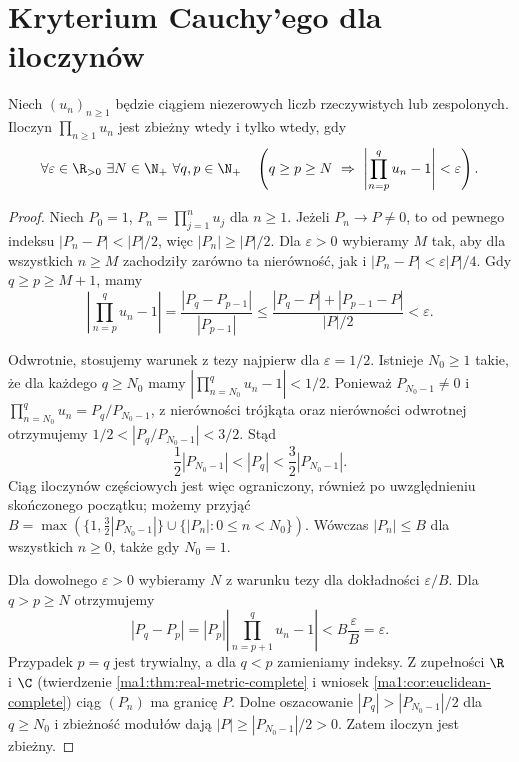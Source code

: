 \section{Kryterium Cauchy'ego dla iloczynów}
\begin{twierdzenie}
\label{ma1:thm:product-cauchy}
Niech $(u_n)_{n\ge1}$ będzie ciągiem niezerowych liczb rzeczywistych lub zespolonych. Iloczyn $\prod_{n\ge1}u_n$ jest zbieżny wtedy i tylko wtedy, gdy
\[
 \forall\varepsilon\in\R_{>0}\ \exists N\in\N_+\
 \forall q,p\in\N_+\quad
 \left(q\ge p\ge N\ \Rightarrow\
 \left|\prod_{n=p}^{q}u_n-1\right|<\varepsilon\right).
\]
\end{twierdzenie}
\begin{proof}
Niech $P_0=1$, $P_n=\prod_{j=1}^n u_j$ dla $n\ge1$. Jeżeli $P_n\to P\ne0$, to od pewnego indeksu $|P_n-P|<|P|/2$, więc $|P_n|\ge|P|/2$. Dla $\varepsilon>0$ wybieramy $M$ tak, aby dla wszystkich $n\ge M$ zachodziły zarówno ta nierówność, jak i $|P_n-P|<\varepsilon|P|/4$. Gdy $q\ge p\ge M+1$, mamy
\[
 \left|\prod_{n=p}^q u_n-1\right|
 =\frac{|P_q-P_{p-1}|}{|P_{p-1}|}
 \le\frac{|P_q-P|+|P_{p-1}-P|}{|P|/2}
 <\varepsilon.
\]

Odwrotnie, stosujemy warunek z tezy najpierw dla $\varepsilon=1/2$. Istnieje $N_0\ge1$ takie, że dla każdego $q\ge N_0$ mamy $|\prod_{n=N_0}^q u_n-1|<1/2$. Ponieważ $P_{N_0-1}\ne0$ i $\prod_{n=N_0}^q u_n=P_q/P_{N_0-1}$, z nierówności trójkąta oraz nierówności odwrotnej otrzymujemy $1/2<|P_q/P_{N_0-1}|<3/2$. Stąd
\[
 \frac12|P_{N_0-1}|<|P_q|<\frac32|P_{N_0-1}|.
\]
Ciąg iloczynów częściowych jest więc ograniczony, również po uwzględnieniu skończonego początku; możemy przyjąć $B=\max(\{1,\frac32|P_{N_0-1}|\}\cup\{|P_n|:0\le n<N_0\})$. Wówczas $|P_n|\le B$ dla wszystkich $n\ge0$, także gdy $N_0=1$.

Dla dowolnego $\varepsilon>0$ wybieramy $N$ z warunku tezy dla dokładności $\varepsilon/B$. Dla $q>p\ge N$ otrzymujemy
\[
 |P_q-P_p|=|P_p|\left|\prod_{n=p+1}^q u_n-1\right|
 <B\frac{\varepsilon}{B}=\varepsilon.
\]
Przypadek $p=q$ jest trywialny, a dla $q<p$ zamieniamy indeksy. Z zupełności $\R$ i $\C$ (twierdzenie \ref{ma1:thm:real-metric-complete} i wniosek \ref{ma1:cor:euclidean-complete}) ciąg $(P_n)$ ma granicę $P$. Dolne oszacowanie $|P_q|>|P_{N_0-1}|/2$ dla $q\ge N_0$ i zbieżność modułów dają $|P|\ge |P_{N_0-1}|/2>0$. Zatem iloczyn jest zbieżny.
\end{proof}

